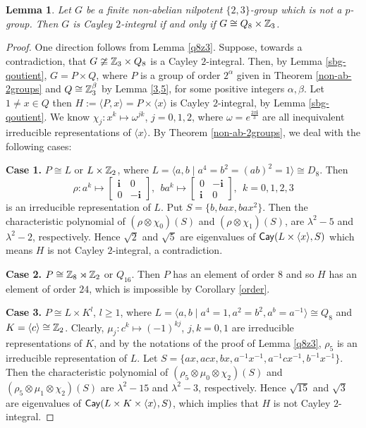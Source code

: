 \documentclass{amsart}
\newtheorem{lem}[thm]{Lemma}
\def \geq {\geqslant}
\def\Cay{{\sf Cay}} \def\Ker{{\sf Ker}}
\begin{document}
\begin{lem}\label{nilpotent}
  Let $G$ be a finite non-abelian nilpotent $\{2,3\}$-group which is not a $p$-group. Then $G$ is Cayley $2$-integral if and only if $G\cong  Q_8\times\Bbb Z_3$.
	\end{lem}
	\begin{proof}
		One direction follows from Lemma \ref{q8z3}. Suppose, towards a contradiction, that  $G\ncong \Bbb Z_3\times Q_8$ is a Cayley $2$-integral. Then, by Lemma \ref{sbg-qoutient}, $G=P\times Q$, where $P$ is a group of order $2^\alpha$ given in Theorem \ref{non-ab-2groups} and $Q\cong\Bbb Z_3^\beta$ by Lemma \ref{3,5}, for some positive integers $\alpha,\beta$.		
 Let $1\neq x\in Q$ then $H:=\langle P, x\rangle=P\times\langle x\rangle$ is Cayley $2$-integral, by Lemma \ref{sbg-qoutient}. We know $\chi_j:x^k\mapsto \omega^{jk}$, $j=0,1,2$, where $\omega=e^{\frac{2\pi\textbf{i}}{3}}$ are all inequivalent irreducible representations of $\langle x\rangle$.  By Theorem \ref{non-ab-2groups}, we deal with the following cases:
		
		\textbf{Case 1.} $P\cong L$ or $L\times\Bbb Z_2 $, where $L=\langle a,b\mid a^4=b^2=(ab)^2=1\rangle\cong D_8$.  Then 
		\[\rho:a^k\mapsto \begin{bmatrix}
			\textbf{i}&0\\
			0&-\textbf{i}
	\end{bmatrix},~~ba^k\mapsto\begin{bmatrix}
		0&-\textbf{i}\\
		\textbf{i}&0
		\end{bmatrix},~~k=0,1,2,3\]
		is an irreducible representation of $L$. Put $S=\{b,bax,bax^2\}$. Then the characteristic polynomial of $(\rho\otimes\chi_0)(S)$ and $(\rho\otimes\chi_1)(S)$, are $\lambda^2-5$ and $\lambda^2-2$, respectively. Hence $\sqrt{2}$ and $\sqrt{5}$ are eigenvalues of $\Cay(L\times\langle x\rangle,S)$ which means $H$ is not Cayley $2$-integral, a contradiction.
		
		\textbf{Case 2.}  $P\cong\Bbb Z_8\rtimes\Bbb Z_2$ or $Q_{16}$. Then $P$ has an element of order $8$ and so $H$ has  an element of order $24$, which is impossible by Corollary \ref{order}.
		
			\textbf{Case 3.} $P\cong L\times  K^l$, $l\geq 1$, where $L=\langle a,b\mid a^4=1, a^2=b^2, a^b=a^{-1}\rangle\cong Q_8$ and $K=\langle c\rangle\cong\Bbb Z_2$. Clearly, $\mu_j:c^k\mapsto (-1)^{kj}$, $j,k=0,1$ are irreducible representations of $K$, and by the notations of the proof of Lemma \ref{q8z3}, $\rho_5$ is an irreducible representation of $L$.  Let $S=\{ax,acx,bx,a^{-1}x^{-1},a^{-1}cx^{-1},b^{-1}x^{-1}\}$. Then the characteristic polynomial of $(\rho_5\otimes\mu_0\otimes\chi_2)(S)$ and $(\rho_5\otimes\mu_1\otimes\chi_2)(S)$ are $\lambda^2-15$ and $\lambda^2-3$, respectively. Hence $\sqrt{15}$ and $\sqrt{3}$ are eigenvalues of $\Cay(L\times K\times\langle x\rangle,S)$, which implies that $H$ is not Cayley $2$-integral. 
		

\end{proof}
\end{document}
